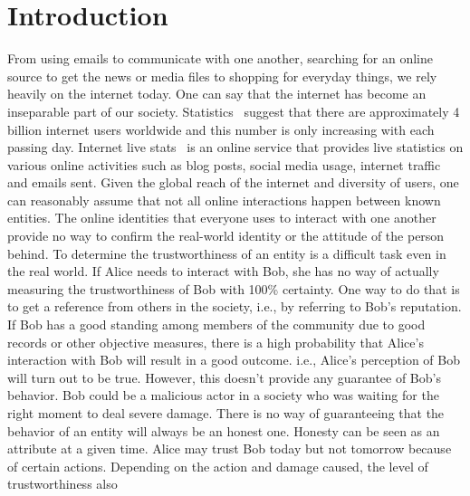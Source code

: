 \chapter{Introduction}\label{ch:intro}
From using emails to communicate with one another, searching for an online
source to get the news or media files to shopping for everyday things, we rely
heavily on the internet today. One can say that the internet has become an
inseparable part of our society. Statistics~\cite{InternetWorldStat} suggest
that there are approximately 4 billion internet users worldwide and this number
is only increasing with each passing day. Internet live
stats~\cite{InternetLiveStat} is an online service that provides live
statistics on various online activities such as blog posts, social media usage,
internet traffic and emails sent. Given the global reach of the internet and
diversity of users, one can reasonably assume that not all online interactions
happen between known entities. The online identities that everyone uses to
interact with one another provide no way to confirm the real-world identity or
the attitude of the person behind. To determine the trustworthiness of an
entity is a difficult task even in the real world. If Alice needs to interact
with Bob, she has no way of actually measuring the trustworthiness of Bob with
100\% certainty. One way to do that is to get a reference from others in the
society, i.e., by referring to Bob's reputation. If Bob has a good standing
among members of the community due to good records or other objective measures,
there is a high probability that Alice's interaction with Bob will result in a
good outcome. i.e., Alice's perception of Bob will turn out to be true.
However, this doesn't provide any guarantee of Bob's behavior. Bob could be a
malicious actor in a society who was waiting for the right moment to deal
severe damage. There is no way of guaranteeing that the behavior of an entity
will always be an honest one. Honesty can be seen as an attribute at a given
time. Alice may trust Bob today but not tomorrow because of certain actions.
Depending on the action and damage caused, the level of trustworthiness also
